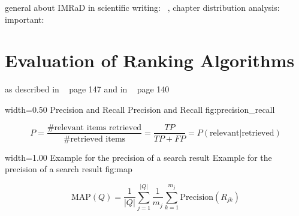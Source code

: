 general about IMRaD in scientific writing: ~\cite{robert1989}, chapter distribution analysis: ~\cite{bertin2013} important: ~\cite{Sollaci-The-2004}

\section{Evaluation of Ranking Algorithms}
\label{sec:evaluation_of_ranking_algorithms}

as described in ~\cite{manning2008} page 147 and in ~\cite{ModernInvormationRetrieval1999} page 140

      {width=0.50\textwidth}
      {Precision and Recall}
      {Precision and Recall}
      {fig:precision_recall}

\begin{equation}
  P = \frac{\text{\# relevant items retrieved}}{\text{\# retrieved items}} = \frac{TP}{TP + FP} = P(\text{relevant} | \text{retrieved})
\end{equation}

      {width=1.00\textwidth}
      {Example for the precision of a search result}
      {Example for the precision of a search result}
      {fig:map}

\begin{equation}
  \text{MAP}(Q) = \frac{1}{|Q|}\sum_{j = 1}^{|Q|} \frac{1}{m_j}\sum_{k = 1}^{m_j}\text{Precision}(R_{jk})
\end{equation}

